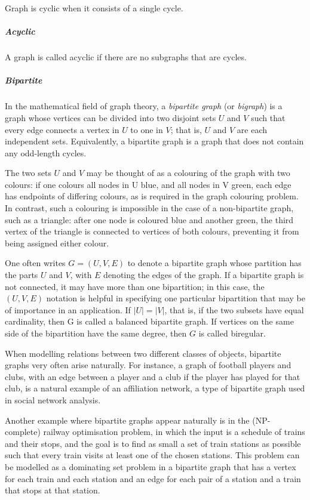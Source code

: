           Graph is cyclic when it consists of a single cycle.
          
        \subparagraph{Acyclic}
        
          A graph is called acyclic if there are no subgraphs that are cycles.

        \subparagraph{Bipartite}
        
          In the mathematical field of graph theory, a \emph{bipartite graph} (or \emph{bigraph}) is a graph whose vertices can be divided into two disjoint sets $U$ and $V$ such that every edge connects a vertex in $U$ to one in $V$; that is, $U$ and $V$ are each independent sets. Equivalently, a bipartite graph is a graph that does not contain any odd-length cycles.\cite{Diestel2012,AsratianDenleyHaggkvist}

          The two sets $U$ and $V$ may be thought of as a colouring of the graph with two colours: if one colours all nodes in U blue, and all nodes in V green, each edge has endpoints of differing colours, as is required in the graph colouring problem.\cite{AsratianDenleyHaggkvist,Scheinerman2012} In contrast, such a colouring is impossible in the case of a non-bipartite graph, such as a triangle: after one node is coloured blue and another green, the third vertex of the triangle is connected to vertices of both colours, preventing it from being assigned either colour.
          
          One often writes $G=(U,V,E)$ to denote a bipartite graph whose partition has the parts $U$ and $V$, with $E$ denoting the edges of the graph. If a bipartite graph is not connected, it may have more than one bipartition;\cite{ChartrandZhang2008} in this case, the $(U,V,E)$ notation is helpful in specifying one particular bipartition that may be of importance in an application. If $|U|=|V|$, that is, if the two subsets have equal cardinality, then G is called a balanced bipartite graph.\cite{AsratianDenleyHaggkvist} If vertices on the same side of the bipartition have the same degree, then $G$ is called biregular.
          
          When modelling relations between two different classes of objects, bipartite graphs very often arise naturally. For instance, a graph of football players and clubs, with an edge between a player and a club if the player has played for that club, is a natural example of an affiliation network, a type of bipartite graph used in social network analysis.\cite{WassermanFaust1994}

          Another example where bipartite graphs appear naturally is in the (NP-complete) railway optimisation problem, in which the input is a schedule of trains and their stops, and the goal is to find as small a set of train stations as possible such that every train visits at least one of the chosen stations. This problem can be modelled as a dominating set problem in a bipartite graph that has a vertex for each train and each station and an edge for each pair of a station and a train that stops at that station.\cite{Niedermeier2006}

